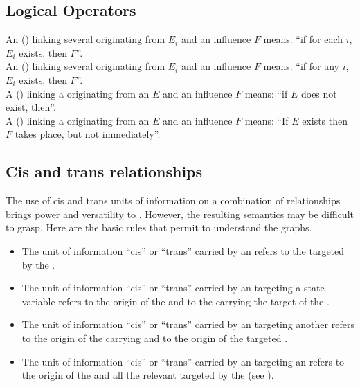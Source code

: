 \subsection{Logical Operators}

An  () linking several  originating from  $E_i$ and an influence $F$ means: ``if for each $i$, $E_i$ exists, then $F$''.\\[\baselineskip]

\noindent
An  () linking several  originating from  $E_i$ and an influence $F$ means: ``if for any $i$, $E_i$ exists, then $F$''.\\[\baselineskip]

\noindent
A  () linking a  originating from an  $E$ and an influence $F$ means: ``if $E$ does not exist, then''.\\[\baselineskip]

\noindent
A  () linking a  originating from an  $E$ and an influence $F$ means: ``If $E$ exists then $F$ takes place, but not immediately''.\\[\baselineskip]

\subsection{Cis and trans relationships}

The use of cis and trans units of information on a combination of relationships brings power and versatility to \ERs. However, the resulting semantics may be difficult to grasp. Here are the basic rules that permit to understand the graphs.

\begin{itemize}
 \item The unit of information ``cis'' or ``trans'' carried by an  refers to the  targeted by the . 
 \item The unit of information ``cis'' or ``trans'' carried by an  targeting a state variable  refers to the origin of the  and to the  carrying the target of the . 
\item The unit of information ``cis'' or ``trans'' carried by an  targeting another  refers to the origin of the carrying  and to the origin of the targeted .
 \item The unit of information ``cis'' or ``trans'' carried by an  targeting an  refers to the origin of the  and all the relevant  targeted by the  (see ).
\end{itemize}

